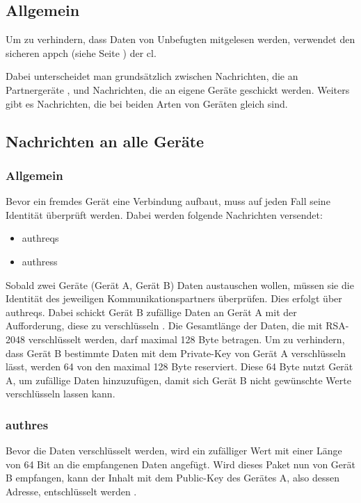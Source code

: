 \subsection{Allgemein}
Um zu verhindern, dass Daten von Unbefugten mitgelesen werden, verwendet \sblit den sicheren \gls{appch} (siehe Seite \pageref{dcl-appch}) der \gls{cl}.

Dabei unterscheidet man grundsätzlich zwischen Nachrichten, die an Partnergeräte , und Nachrichten, die an eigene Geräte geschickt werden. Weiters gibt es Nachrichten, die bei beiden Arten von Geräten gleich sind.

\subsection{Nachrichten an alle Geräte}
\subsubsection{Allgemein}
Bevor ein fremdes Gerät eine Verbindung aufbaut, muss auf jeden Fall seine Identität überprüft werden. Dabei werden folgende Nachrichten versendet:
\begin{itemize}
	\item \gls{authreq}s
	\item \gls{authres}s
\end{itemize}
\sblitauthreqbytefield

Sobald zwei Geräte (Gerät A, Gerät B) Daten austauschen wollen, müssen sie die Identität des jeweiligen Kommunikationspartners überprüfen. Dies erfolgt über \gls{authreq}s. Dabei schickt Gerät B zufällige Daten an Gerät A mit der Aufforderung, diese zu verschlüsseln . 
Die Gesamtlänge der Daten, die mit RSA-2048 verschlüsselt werden, darf maximal 128 Byte betragen. Um zu verhindern, dass Gerät B bestimmte Daten mit dem Private-Key von Gerät A verschlüsseln lässt, werden 64 von den maximal 128 Byte reserviert. Diese 64 Byte nutzt Gerät A, um zufällige Daten hinzuzufügen, damit sich Gerät B nicht gewünschte Werte verschlüsseln lassen kann.

\subsubsection{\gls{authres}}
\sblitauthresbytefield
Bevor die Daten verschlüsselt werden, wird ein zufälliger Wert mit einer Länge von 64 Bit an die empfangenen Daten angefügt.
Wird dieses Paket nun von Gerät B empfangen, kann der Inhalt mit dem Public-Key des Gerätes A, also dessen Adresse, entschlüsselt werden .
		
